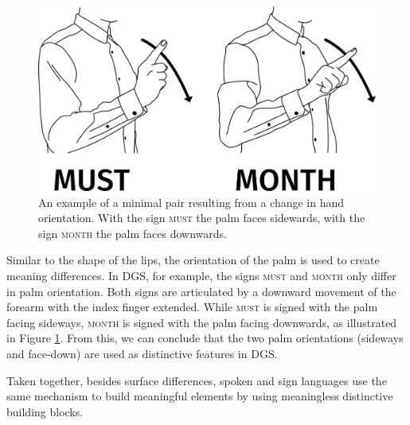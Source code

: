 \begin{figure}[bt]
\centering
	\includegraphics[width=1.0\textwidth]{minimalpair1.jpg}
	\caption{An example of a minimal pair resulting from a change in hand orientation. With the sign \textsc{must} the palm faces sidewards, with the sign \textsc{month} the palm faces downwards.}
	\label{minimalpairone}
\end{figure}

Similar to the shape of the lips, the orientation of the palm is used to create meaning differences. In DGS, for example, the signs \textsc{must} and \textsc{month} only differ in palm orientation. Both signs are articulated by a downward movement of the forearm with the index finger extended.  While \textsc{must} is signed with the palm facing sideways, \textsc{month} is signed with the palm facing downwards, as illustrated in Figure \ref{minimalpairone}. From this, we can conclude that the two palm orientations (sideways and face-down) are used as distinctive features in DGS.

Taken together, besides surface differences, spoken and sign languages use the same mechanism to build meaningful elements by using meaningless distinctive building blocks. 



